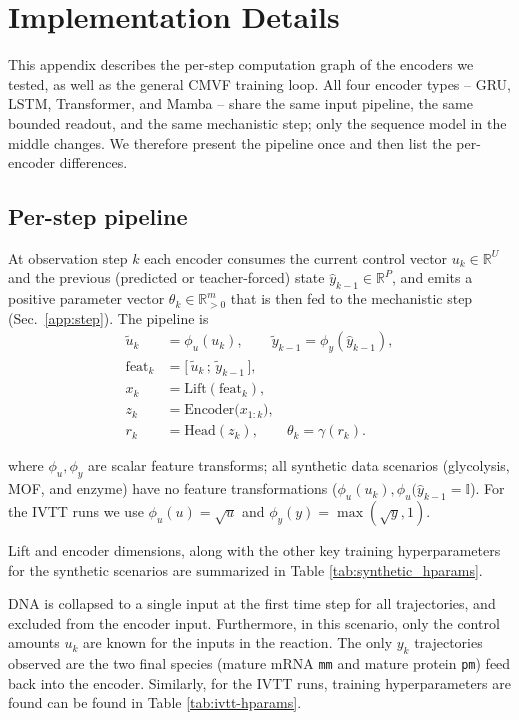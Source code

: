
\chapter{Implementation Details}
\label{app:implementation}

This appendix describes the per-step computation graph of the encoders we
tested, as well as the general CMVF training loop. All four encoder types -- GRU, LSTM, Transformer, and Mamba -- share the same input pipeline, the same bounded readout, and the
same mechanistic step; only the sequence model in the middle changes. We
therefore present the pipeline once and then list the per-encoder differences.

\section{Per-step pipeline}
\label{app:pipeline}

At observation step $k$ each encoder consumes the current control vector
$u_k \in \mathbb{R}^{U}$ and the previous (predicted or teacher-forced) state
$\hat{y}_{k-1} \in \mathbb{R}^{P}$, and emits a positive parameter vector
$\theta_k \in \mathbb{R}^{m}_{>0}$ that is then fed to the mechanistic step
(Sec.~\ref{app:step}). The pipeline is
\begin{align}
\tilde{u}_k &= \phi_u(u_k), \qquad \tilde{y}_{k-1} = \phi_y(\hat{y}_{k-1}), \\
\mathrm{feat}_k &= \big[\,\tilde{u}_k\,;\,\tilde{y}_{k-1}\,\big], \\
x_k &= \mathrm{Lift}(\mathrm{feat}_k), \\
z_k &= \mathrm{Encoder}\big(x_{1:k}\big), \\
r_k &= \mathrm{Head}(z_k), \qquad \theta_k = \gamma(r_k).
\end{align}

where $\phi_u, \phi_y$ are scalar feature transforms; all synthetic data scenarios (glycolysis, MOF, and enzyme) have no feature transformations ($\phi_u(u_k),\phi_u(\hat{y}_{k-1} = \mathbb{I}$). For the IVTT runs we use
$\phi_u(u) = \sqrt{u}$ and
$\phi_y(y) = \max(\sqrt{y}, 1)$.

Lift and encoder dimensions, along with the other key training hyperparameters for the synthetic scenarios are summarized in Table \ref{tab:synthetic_hparams}. 

 DNA is collapsed to a single input at the first time step for all trajectories, and excluded from the encoder input. Furthermore, in this scenario, only the control amounts $u_k$ are known for the inputs in the reaction. The only $y_k$ trajectories observed are the two final  species (mature mRNA
\texttt{mm} and mature protein \texttt{pm}) feed back into the encoder. Similarly, for the IVTT runs, training hyperparameters are found can be found in Table \ref{tab:ivtt-hparams}. 

